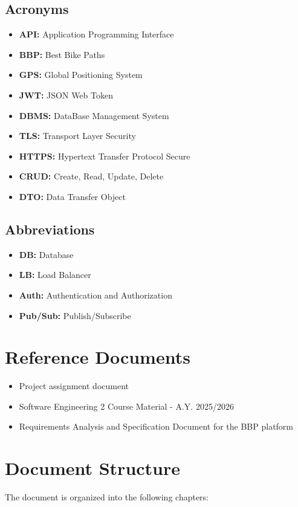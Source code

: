 \subsection{Acronyms}
\begin{itemize}
    \item \textbf{API:} Application Programming Interface
    \item \textbf{BBP:} Best Bike Paths
    \item \textbf{GPS:} Global Positioning System
    \item \textbf{JWT:} JSON Web Token
    \item \textbf{DBMS:} DataBase Management System
    \item \textbf{TLS:} Transport Layer Security
    \item \textbf{HTTPS:} Hypertext Transfer Protocol Secure
    \item \textbf{CRUD:} Create, Read, Update, Delete
    \item \textbf{DTO:} Data Transfer Object
\end{itemize}

\subsection{Abbreviations}
\begin{itemize}
    \item \textbf{DB:} Database
    \item \textbf{LB:} Load Balancer
    \item \textbf{Auth:} Authentication and Authorization
    \item \textbf{Pub/Sub:} Publish/Subscribe
\end{itemize}

\section{Reference Documents}
\begin{itemize}
    \item Project assignment document
    \item Software Engineering 2 Course Material - A.Y. 2025/2026
    \item Requirements Analysis and Specification Document for the BBP platform
\end{itemize}

\section{Document Structure}
The document is organized into the following chapters:

